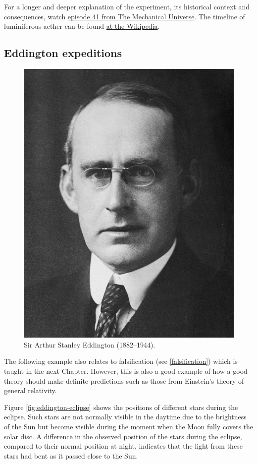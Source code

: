 \documentclass[
]{book}
\begin{document}
For a longer and deeper explanation of the experiment, its historical context and consequences, watch \href{https://www.youtube.com/watch?v=Ip_jdcA8fcw}{episode 41 from The Mechanical Universe}. The timeline of luminiferous aether can be found \href{https://en.wikipedia.org/wiki/Timeline_of_luminiferous_aether}{at the Wikipedia}.

\hypertarget{eddington-expeditions}{%
\subsection{Eddington expeditions}\label{eddington-expeditions}}

\begin{figure}  
 \begin{center}
    \includegraphics[width=.22\textwidth]{Figures/Arthur_Stanley_Eddington.jpg}  
  \captionsetup{labelformat=empty}
  \caption{Sir Arthur Stanley Eddington (1882–1944).} 
\end{center}
\end{figure}
\addtocounter{figure}{-1}

The following example also relates to falsification (see \ref{falsification}) which is taught in the next Chapter. However, this is also a good example of how a good theory should make definite predictions such as those from Einstein's theory of general relativity.

Figure \ref{fig:eddington-eclipse} shows the positions of different stars during the eclipse. Such stars are not normally visible in the daytime due to the brightness of the Sun but become visible during the moment when the Moon fully covers the solar disc. A difference in the observed position of the stars during the eclipse, compared to their normal position at night, indicates that the light from these stars had bent as it passed close to the Sun.
\end{document}
